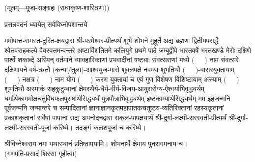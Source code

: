 
\setlength{\parindent}{0pt}
\centerline{\small{(मूलम्—पूजा-सङ्ग्रहः (राधाकृष्ण-शास्त्रिणः))}}


 

{प्रसन्नवदनं ध्यायेत् सर्वविघ्नोपशान्तये}
 

ममोपात्त-समस्त-दुरित-क्षयद्वारा श्री-परमेश्वर-प्रीत्यर्थं शुभे शोभने मुहूर्ते अद्य ब्रह्मणः
द्वितीयपरार्द्धे श्वेतवराहकल्पे वैवस्वतमन्वन्तरे अष्टाविंशतितमे कलियुगे प्रथमे पादे
जम्बूद्वीपे भारतवर्षे भरतखण्डे मेरोः दक्षिणे पार्श्वे शकाब्दे अस्मिन् वर्तमाने व्यावहारिकाणां प्रभवादीनां षष्ट्याः संवत्सराणां मध्ये \mbox{(~~~)} नाम संवत्सरे दक्षिणायने 
वर्ष-ऋतौ (कन्या/तुला)-आश्वयुज-मासे शुक्लपक्षे नवम्यां शुभतिथौ \mbox{(~~~)}-वासरयुक्तायाम्
\mbox{(~~~)} नक्षत्र \mbox{(~~~)} नाम  योग  \mbox{(~~~)} करण युक्तायां च एवं गुण विशेषण विशिष्टायाम्
अस्याम् \mbox{(~~~)} शुभतिथौ 
अस्माकं सहकुटुम्बानां क्षेमस्थैर्य-धैर्य-वीर्य-विजय-आयुरारोग्य-ऐश्वर्याभिवृद्ध्यर्थम्
 धर्मार्थकाममोक्ष\-चतुर्विधफलपुरुषार्थसिद्ध्यर्थं पुत्रपौत्राभि\-वृद्ध्यर्थम् इष्टकाम्यार्थसिद्ध्यर्थम्
मम इहजन्मनि पूर्वजन्मनि जन्मान्तरे च सम्पादितानां ज्ञानाज्ञानकृतमहा\-पातकचतुष्टय-व्यतिरिक्तानां रहस्यकृतानां प्रकाशकृतानां सर्वेषां पापानां सद्य अपनोदनद्वारा सकल-पापक्षयार्थं 
श्री-दुर्गा-लक्ष्मी-सरस्वती-प्रीत्यर्थं श्री-दुर्गा-लक्ष्मी-सरस्वती-पूजां करिष्ये।
तदङ्गं कलशपूजां च करिष्ये। 


श्रीविघ्नेश्वराय नमः यथास्थानं प्रतिष्ठापयामि। शोभनार्थे क्षेमाय पुनरागमनाय च।\\
(गणपति-प्रसादं शिरसा गृहीत्वा)













\renewcommand{\devAya}{श्री-दुर्गा-लक्ष्मी-युक्तायै सरस्वत्यै नमः,}



